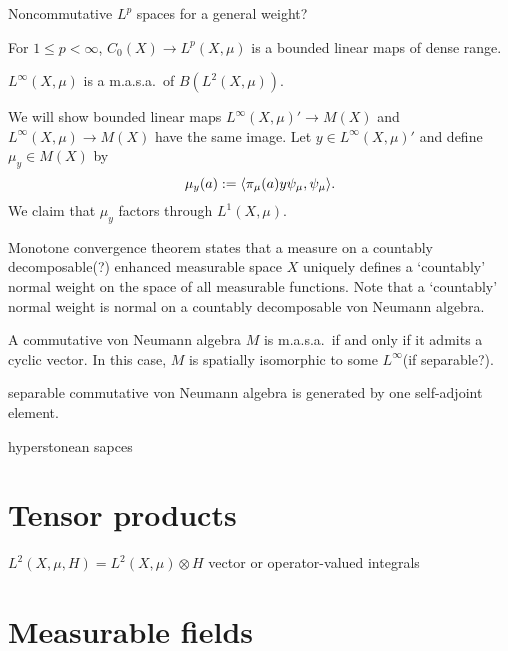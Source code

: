 \documentclass{../../large}
\begin{document}
\begin{prb}
\end{prb}


\begin{prb}
Noncommutative $L^p$ spaces for a general weight?
\begin{parts}
\item For $1\le p<\infty$, $C_0(X)\to L^p(X,\mu)$ is a bounded linear maps of dense range.
\item $L^\infty(X,\mu)$ is a m.a.s.a.~of $B(L^2(X,\mu))$.
\end{parts}
\end{prb}
\begin{pf}
We will show bounded linear maps $L^\infty(X,\mu)'\to M(X)$ and $L^\infty(X,\mu)\to M(X)$ have the same image.
Let $y\in L^\infty(X,\mu)'$ and define $\mu_y\in M(X)$ by
\[\mu_y(a):=\langle\pi_\mu(a)y\psi_\mu,\psi_\mu\rangle.\]
We claim that $\mu_y$ factors through $L^1(X,\mu)$.
\end{pf}

Monotone convergence theorem states that a measure on a countably decomposable(?) enhanced measurable space $X$ uniquely defines a `countably' normal weight on the space of all measurable functions.
Note that a `countably' normal weight is normal on a countably decomposable von Neumann algebra.



\begin{prb}
A commutative von Neumann algebra $M$ is m.a.s.a.~if and only if it admits a cyclic vector.
In this case, $M$ is spatially isomorphic to some $L^\infty$(if separable?).
\end{prb}
\begin{pf}
\end{pf}

separable commutative von Neumann algebra is generated by one self-adjoint element.

hyperstonean sapces





\section{Tensor products}

$L^2(X,\mu,H)=L^2(X,\mu)\otimes H$
vector or operator-valued integrals

\section{Measurable fields}
\end{document}
